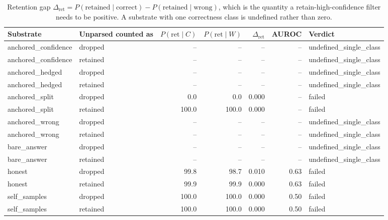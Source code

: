 \begin{table}[t]
\centering
\caption{Retention gap $\Delta_{\mathrm{ret}} = P(\text{retained}\mid\text{correct}) - P(\text{retained}\mid\text{wrong})$, which is the quantity a retain-high-confidence filter needs to be positive. A substrate with one correctness class is undefined rather than zero.\label{tab:gate}}
\begin{adjustbox}{max width=\linewidth}
\begin{tabular}{@{}llrrrrl@{}}
\toprule
Substrate & Unparsed counted as & $P(\text{ret}\mid C)$ & $P(\text{ret}\mid W)$ & $\Delta_{\mathrm{ret}}$ & AUROC & Verdict \\
\midrule
anchored\_confidence & dropped & -- & -- & -- & -- & undefined\_single\_class \\
anchored\_confidence & retained & -- & -- & -- & -- & undefined\_single\_class \\
anchored\_hedged & dropped & -- & -- & -- & -- & undefined\_single\_class \\
anchored\_hedged & retained & -- & -- & -- & -- & undefined\_single\_class \\
anchored\_split & dropped & 0.0 & 0.0 & 0.000 & -- & failed \\
anchored\_split & retained & 100.0 & 100.0 & 0.000 & -- & failed \\
anchored\_wrong & dropped & -- & -- & -- & -- & undefined\_single\_class \\
anchored\_wrong & retained & -- & -- & -- & -- & undefined\_single\_class \\
bare\_answer & dropped & -- & -- & -- & -- & undefined\_single\_class \\
bare\_answer & retained & -- & -- & -- & -- & undefined\_single\_class \\
honest & dropped & 99.8 & 98.7 & 0.010 & 0.63 & failed \\
honest & retained & 99.9 & 99.9 & 0.000 & 0.63 & failed \\
self\_samples & dropped & 100.0 & 100.0 & 0.000 & 0.50 & failed \\
self\_samples & retained & 100.0 & 100.0 & 0.000 & 0.50 & failed \\
\bottomrule
\end{tabular}
\end{adjustbox}
\end{table}
